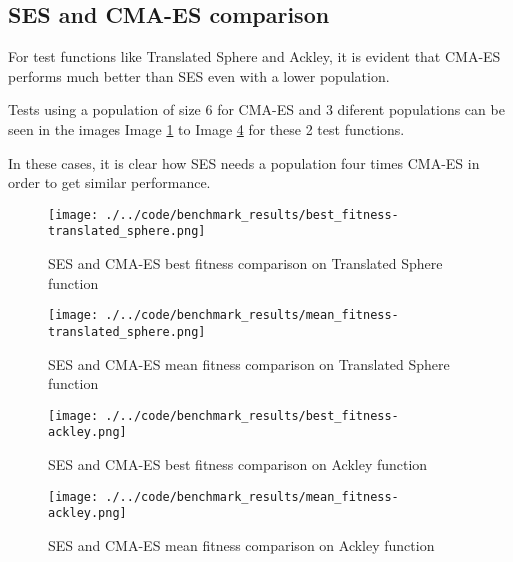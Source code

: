 \subsection{SES and CMA-ES comparison}

For test functions like Translated Sphere and Ackley, it is evident that CMA-ES performs much better than SES even with a lower population.

Tests using a population of size 6 for CMA-ES and 3 diferent populations can be seen in the images Image \ref{img:best_fitness-translated_sphere} to Image \ref{img:mean_fitness-ackley} for these 2 test functions.

In these cases, it is clear how SES needs a population four times CMA-ES in order to get similar performance.

\begin{figure}
  \begin{center}
  \texttt{[image: ./../code/benchmark\_results/best\_fitness-translated\_sphere.png]}
  \caption{SES and CMA-ES best fitness comparison on Translated Sphere function}
  \label{img:best_fitness-translated_sphere}
  \end{center}
\end{figure}

\begin{figure}
  \begin{center}
  \texttt{[image: ./../code/benchmark\_results/mean\_fitness-translated\_sphere.png]}
  \caption{SES and CMA-ES mean fitness comparison on Translated Sphere function}
  \label{img:mean_fitness-translated_sphere}
  \end{center}
\end{figure}

\begin{figure}
  \begin{center}
  \texttt{[image: ./../code/benchmark\_results/best\_fitness-ackley.png]}
  \caption{SES and CMA-ES best fitness comparison on Ackley function}
  \label{img:best_fitness-ackley}
  \end{center}
\end{figure}

\begin{figure}
  \begin{center}
  \texttt{[image: ./../code/benchmark\_results/mean\_fitness-ackley.png]}
  \caption{SES and CMA-ES mean fitness comparison on Ackley function}
  \label{img:mean_fitness-ackley}
  \end{center}
\end{figure}

